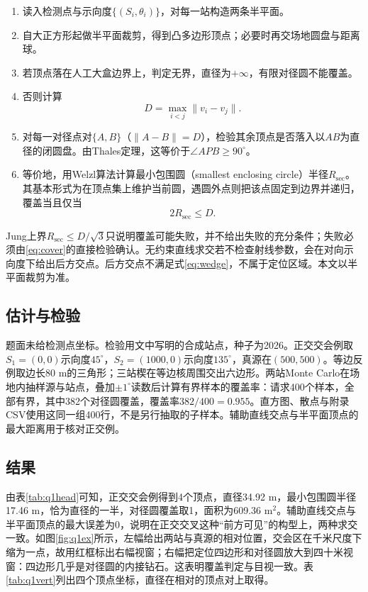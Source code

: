 \documentclass{cumcmthesis}
\begin{document}
\begin{enumerate}
\item 读入检测点与示向度$\{(S_i,\theta_i)\}$，对每一站构造两条半平面。
\item 自大正方形起做半平面裁剪，得到凸多边形顶点；必要时再交场地圆盘与距离球。
\item 若顶点落在人工大盒边界上，判定无界，直径为$+\infty$，有限对径圆不能覆盖。
\item 否则计算
\begin{equation}
D=\max_{i<j}\|v_i-v_j\|.
\label{eq:dvert}
\end{equation}
\item 对每一对径点对$\{A,B\}$（$\|A-B\|=D$），检验其余顶点是否落入以$AB$为直径的闭圆盘。由Thales定理，这等价于$\angle APB\ge 90^\circ$。
\item 等价地，用Welzl算法计算最小包围圆（smallest enclosing circle）半径$R_{\mathrm{sec}}$\cite{welzl1991}。其基本形式为在顶点集上维护当前圆，遇圆外点则把该点固定到边界并递归，覆盖当且仅当
\begin{equation}
2R_{\mathrm{sec}}\le D.
\label{eq:cover}
\end{equation}
\end{enumerate}

Jung上界$R_{\mathrm{sec}}\le D/\sqrt{3}$只说明覆盖可能失败，并不给出失败的充分条件；失败必须由\eqref{eq:cover}的直接检验确认。无约束直线求交若不检查射线参数，会在对向示向度下给出后方交点。后方交点不满足式\eqref{eq:wedge}，不属于定位区域。本文以半平面裁剪为准。

\subsection{估计与检验}

题面未给检测点坐标。检验用文中写明的合成站点，种子为2026。正交交会例取$S_1=(0,0)$示向度$45^\circ$，$S_2=(1000,0)$示向度$135^\circ$，真源在$(500,500)$。等边反例取边长80 m的三角形；三站楔在等边核周围交出六边形。两站Monte Carlo在场地内抽样源与站点，叠加$\pm 1^\circ$读数后计算有界样本的覆盖率：请求400个样本，全部有界，其中382个对径圆覆盖，覆盖率$382/400=0.955$。直方图、散点与附录CSV使用这同一组400行，不是另行抽取的子样本。辅助直线交点与半平面顶点的最大距离用于核对正交例。

\subsection{结果}

由表\ref{tab:q1head}可知，正交交会例得到4个顶点，直径34.92 m，最小包围圆半径17.46 m，恰为直径的一半，对径圆覆盖取1，面积为609.36 m$^2$。辅助直线交点与半平面顶点的最大误差为0，说明在正交交叉这种“前方可见”的构型上，两种求交一致。如图\ref{fig:q1ex}所示，左幅给出两站与真源的相对位置，交会区在千米尺度下缩为一点，故用红框标出右幅视窗；右幅把定位四边形和对径圆放大到四十米视窗：四边形几乎是对径圆的内接钻石。这表明覆盖判定与目视一致。表\ref{tab:q1vert}列出四个顶点坐标，直径在相对的顶点对上取得。
\end{document}

